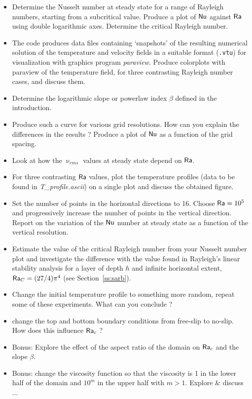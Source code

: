 \begin{itemize}
\item Determine the Nusselt number at steady state for a range of Rayleigh numbers, 
starting from a subcritical value. 
Produce a plot of ${\mathsf{Nu}}$ against ${\mathsf{Ra}}$ using double logarithmic axes. 
Determine the critical Rayleigh number. 

\item The code produces data files containing ‘snapshots’ of the resulting numerical solution 
of the temperature and velocity fields in a suitable format ({\tt .vtu}) for visualization with 
graphics program {\sl paraview}. 
Produce colorplots with paraview of the temperature field, for three contrasting Rayleigh number cases, 
and discuss them.

\item Determine the logarithmic slope or powerlaw index $\beta$ defined in the introduction.

\item Produce such a curve for various grid resolutions. How can you explain the differences in 
the results ? Produce a plot of ${\mathsf{Nu}}$ as a function of the grid spacing. 

\item Look at how the $\upnu_{rms}$ values at steady state depend on ${\mathsf{Ra}}$. 

\item For three contrasting ${\mathsf{Ra}}$ values, plot the temperature profiles 
(data to be found in {\sl T\_profile.ascii}) on a single plot and discuss the obtained figure.

\item Set the number of points in the horizontal directions to 16. Choose ${\mathsf{Ra}}=10^5$ 
and progressively increase the number 
of points in the vertical direction. Report on the variation of the ${\mathsf{Nu}}$ number at steady 
state as a function of the vertical resolution.

\item Estimate the value of the critical Rayleigh number from your Nusselt number plot and 
investigate the difference with the value found in Rayleigh's linear stability analysis 
for a layer of depth $h$ and infinite horizontal extent, ${\mathsf{Ra}}_C = (27/4)  \pi^4$ 
(see Section~\ref{ss:sarb}).

\item Change the initial temperature profile to something more random, repeat some of these experiments. 
What can you conclude ?

\item change the top and bottom boundary conditions from free-slip to no-slip. How 
does this influence ${\mathsf{Ra}}_c$ ?

\item Bonus: Explore the effect of the aspect ratio of the domain on ${\mathsf{Ra}}_c$ and the slope $\beta$.

\item Bonus: change the viscosity function so that the viscosity is 1 in the lower half of the domain 
and $10^m$ in the upper half with $m>1$. Explore \& discuss ...

\end{itemize}


